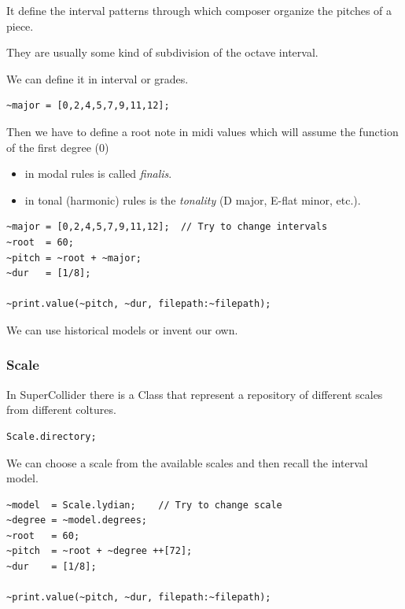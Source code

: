 It define the interval patterns through which composer organize the pitches of a piece.

They are usually some kind of subdivision of the octave interval.

We can define it in interval or grades.

\begin{lstlisting}[frame=single] 
~major = [0,2,4,5,7,9,11,12]; 
\end{lstlisting}

Then we have to define a root note in midi values which will assume the function of the first degree (0)

\begin{itemize}
\tightlist
\item in modal rules is called \textit{finalis}.
\item in tonal (harmonic) rules is the \textit{tonality} (D major, E-flat minor, etc.).
\end{itemize}

\begin{lstlisting}[frame=single] 
~major = [0,2,4,5,7,9,11,12];  // Try to change intervals
~root  = 60;
~pitch = ~root + ~major;
~dur   = [1/8];

~print.value(~pitch, ~dur, filepath:~filepath); 
\end{lstlisting}

We can use historical models or invent our own.

\subsubsection{Scale}\label{scale}

In SuperCollider there is a Class that represent a repository of different scales from different coltures.

\begin{lstlisting}[frame=single] 
Scale.directory;
\end{lstlisting}

We can choose a scale from the available scales and then recall the interval model.

\begin{lstlisting}[frame=single] 
~model  = Scale.lydian;    // Try to change scale
~degree = ~model.degrees; 
~root   = 60;
~pitch  = ~root + ~degree ++[72];
~dur    = [1/8];

~print.value(~pitch, ~dur, filepath:~filepath); 
\end{lstlisting}

